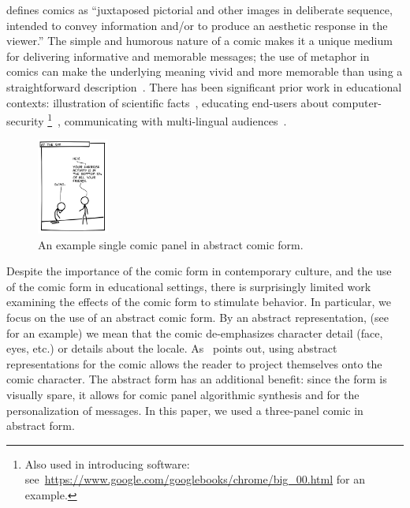 \textcite{scott1993understanding} defines comics as ``juxtaposed pictorial and other images in deliberate sequence, intended to convey information and/or to produce an aesthetic response in the viewer.''  The simple and humorous nature of a comic makes it a unique medium for delivering informative and memorable messages; the use of metaphor in comics can make the underlying meaning vivid and more memorable than using a straightforward description~\parencite{McDermottPB18,scott1993understanding}. There has been significant prior work in educational contexts: illustration of scientific facts~\parencite{McDermottPB18}, educating end-users about computer-security \footnote{Also used in introducing software: see~\url{https://www.google.com/googlebooks/chrome/big_00.html} for an example.}~\parencite{Zhang-Kennedy:2017:SCI:3206217.3206282}, communicating with multi-lingual audiences~\parencite{cary2004going, miguel2005ethnic}. 

\begin{figure}
    \centering
    \includegraphics[width=0.21\textwidth]{figures/intro_new.png}
  \vspace{-10pt}
  \caption{An example single comic panel in abstract comic form.} \label{fig:intro}
  \vspace{-10pt}
\end{figure}

Despite the importance of the comic form in contemporary culture, and the use of the comic form in educational settings, there is surprisingly limited work examining the effects of the comic form to stimulate behavior. In particular, we focus on the use of an abstract comic form. By an abstract representation, (see~ for an example) we mean that the comic de-emphasizes character detail (face, eyes, etc.) or details about the locale. As~\textcite{scott1993understanding} points out, using abstract representations for the comic allows the reader to project themselves onto the comic character. The abstract form has an additional benefit: since the form is visually spare, it allows for comic panel algorithmic synthesis and for the personalization of messages. In this paper, we used a three-panel comic in abstract form.

